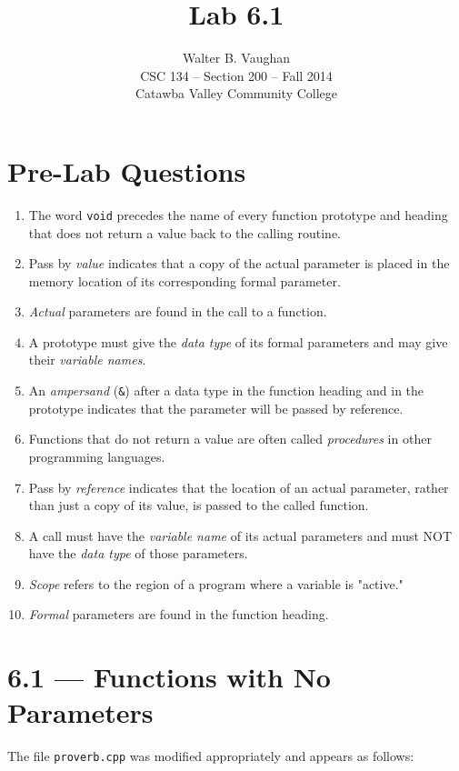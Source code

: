 \documentclass[11pt]{article}
\author{Walter B. Vaughan\\
        \small CSC 134 -- Section 200 -- Fall 2014\\
        \small Catawba Valley Community College}
\title{Lab 6.1}
\date{\vspace{-5ex}}
\begin{document}
\maketitle


\section*{Pre-Lab Questions}
\begin{enumerate}
	\item The word \texttt{void} precedes the name of every function prototype and heading that does not return a value back to the calling routine.
	\item Pass by \emph{value} indicates that a copy of the actual parameter is placed in the memory location of its corresponding formal parameter.
	\item \emph{Actual} parameters are found in the call to a function.
	\item A prototype must give the \emph{data type} of its formal parameters and may give their \emph{variable names}.
	\item An \emph{ampersand} (\texttt{\&}) after a data type in the function heading and in the prototype indicates that the parameter will be passed by reference.
	\item Functions that do not return a value are often called \emph{procedures} in other programming languages.
	\item Pass by \emph{reference} indicates that the location of an actual parameter, rather than just a copy of its value, is passed to the called function.
	\item A call must have the \emph{variable name} of its actual parameters and must NOT have the \emph{data type} of those parameters.
	\item \emph{Scope} refers to the region of a program where a variable is
"active."
	\item \emph{Formal} parameters are found in the function heading.
\end{enumerate}


\newpage %
\section*{6.1 --- Functions with No Parameters}

	The file \texttt{proverb.cpp} was modified appropriately and appears as follows: 
	
\end{document}
